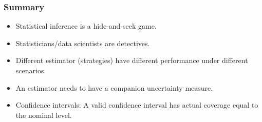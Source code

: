 \documentclass[leqno]{beamer}
\begin{document}
\begin{frame}
  \frametitle{Summary}
  \begin{itemize}
  \item
    Statistical inference is a hide-and-seek game.
  \item
    Statisticians/data scientists are detectives.
  \item
    Different estimator (strategies) have different performance under
    different scenarios.
  \item
    An estimator needs to have a companion uncertainty measure.
  \item
    Confidence intervals: A valid confidence interval has actual
    coverage equal to the nominal level.
  \end{itemize}
\end{frame}
\end{document}
